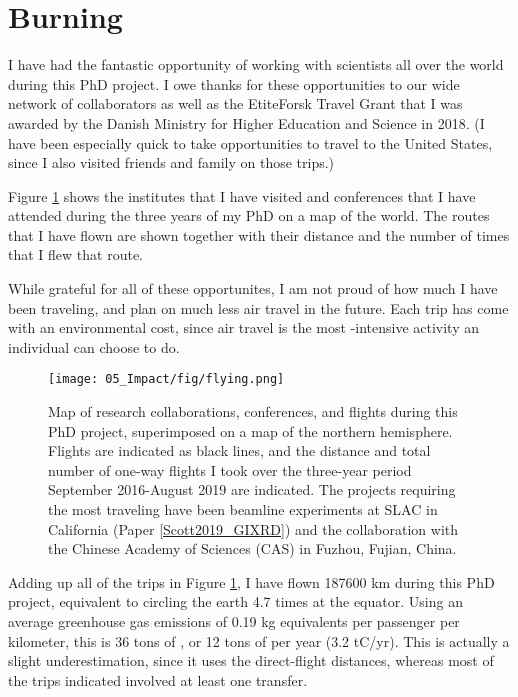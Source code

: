 
\section{Burning}\label{sec:burning}

I have had the fantastic opportunity of working with scientists all over the world during this PhD project. I owe thanks for these opportunities to our wide network of collaborators as well as the EtiteForsk Travel Grant that I was awarded by the Danish Ministry for Higher Education and Science in 2018. (I have been especially quick to take opportunities to travel to the United States, since I also visited friends and family on those trips.)

Figure \ref{fig:flying} shows the institutes that I have visited and conferences that I have attended during the three years of my PhD on a map of the world. The routes that I have flown are shown together with their distance and the number of times that I flew that route.

While grateful for all of these opportunites, I am not proud of how much I have been traveling, and plan on much less air travel in the future. Each trip has come with an environmental cost, since air travel is the most -intensive activity an individual can choose to do.

\begin{figure}[h!]
	\texttt{[image: 05\_Impact/fig/flying.png]}
	\caption{Map of research collaborations, conferences, and flights during this PhD project, superimposed on a map of the northern hemisphere. Flights are indicated as black lines, and the distance and total number of one-way flights I took over the three-year period September 2016-August 2019 are indicated. The projects requiring the most traveling have been beamline experiments at SLAC in California (Paper \ref{Scott2019_GIXRD}) and the collaboration with the Chinese Academy of Sciences (CAS) in Fuzhou, Fujian, China.}
	\label{fig:flying}
\end{figure}

Adding up all of the trips in Figure \ref{fig:flying}, I have flown 187600 km during this PhD project, equivalent to circling the earth 4.7 times at the equator. Using an average greenhouse gas emissions of 0.19 kg  equivalents per passenger per kilometer\cite{Larsson2018}, this is 36 tons of , or 12 tons of  per year (3.2 tC/yr). This is actually a slight underestimation, since it uses the direct-flight distances, whereas most of the trips indicated involved at least one transfer.

